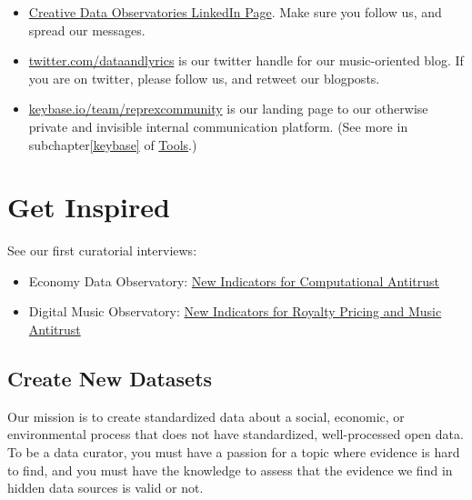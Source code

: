 \documentclass[
  a4paper,
  openany, a4paper, oneside]{book}
\providecommand{\tightlist}{%
  \setlength{\itemsep}{0pt}\setlength{\parskip}{0pt}}
\begin{document}
\begin{itemize}
\item
  \href{https://www.linkedin.com/company/reprexbv/}{Creative Data Observatories LinkedIn Page}. Make sure you follow us, and spread our messages.
\item
  \href{https://twitter.com/dataandlyrics}{twitter.com/dataandlyrics} is our twitter handle for our music-oriented blog. If you are on twitter, please follow us, and retweet our blogposts.
\item
  \href{https://keybase.io/team/reprexcommunity}{keybase.io/team/reprexcommunity} is our landing page to our otherwise private and invisible internal communication platform. (See more in subchapter\ref{keybase} of \protect\hyperlink{keybase}{Tools}.)
\end{itemize}

\hypertarget{get-inspired}{%
\section{Get Inspired}\label{get-inspired}}

See our first curatorial interviews:

\begin{itemize}
\tightlist
\item
  Economy Data Observatory: \href{https://economy.dataobservatory.eu/post/2021-06-02-data-curator-peter-ormosi/}{New Indicators for Computational Antitrust}
\item
  Digital Music Observatory: \href{https://music.dataobservatory.eu/post/2021-06-02-data-curator-eszter-kabai/}{New Indicators for Royalty Pricing and Music Antitrust}
\end{itemize}

\hypertarget{create-new-datasets}{%
\subsection{Create New Datasets}\label{create-new-datasets}}

Our mission is to create standardized data about a social, economic, or environmental process that does not have standardized, well-processed open data. To be a data curator, you must have a passion for a topic where evidence is hard to find, and you must have the knowledge to assess that the evidence we find in hidden data sources is valid or not.
\end{document}
